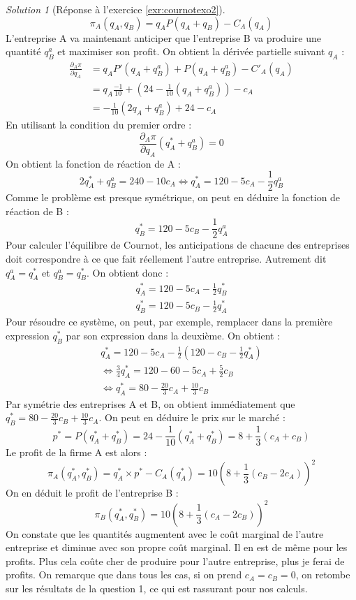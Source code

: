 \documentclass[
]{book}
\theoremstyle{definition}
\theoremstyle{definition}
\theoremstyle{definition}
\theoremstyle{definition}
\theoremstyle{remark}
\newtheorem*{solution}{Solution}
\begin{document}
\begin{solution}[Réponse à l'exercice \ref{exr:cournotexo2}]
\[\pi_A(q_A, q_B)=q_AP(q_A+q_B)-C_A(q_A)\]
L'entreprise A va maintenant anticiper que l'entreprise B va produire une quantité \(q_B^a\) et maximiser son profit.
On obtient la dérivée partielle suivant \(q_A\) :
\begin{align*}
\frac{\partial_A\pi}{\partial q_A}&=q_AP'(q_A+q_B^a)+P(q_A+q_B^a)-C'_A(q_A)\\
&=q_A\frac{-1}{10}+(24-\frac{1}{10}(q_A+q_B^a))-c_A\\
&=-\frac{1}{10}(2q_A+q_B^a)+24-c_A
\end{align*}
En utilisant la condition du premier ordre :
\[\frac{\partial_A\pi}{\partial q_A}(q_A^*+q_B^a)=0\]
On obtient la fonction de réaction de A :
\[2q_A^*+q_B^a=240-10c_A\Leftrightarrow q_A^*=120-5c_A-\frac{1}{2}q_B^a\]
Comme le problème est presque symétrique, on peut en déduire la fonction de réaction de B :
\[q_B^*=120-5c_B-\frac{1}{2}q_A^a\]
Pour calculer l'équilibre de Cournot, les anticipations de chacune des entreprises doit correspondre à ce que fait réellement l'autre entreprise.
Autrement dit \(q_A^a=q_A^*\) et \(q_B^a=q_B^*\).
On obtient donc :
\begin{gather*}
q_A^*=120-5c_A-\frac{1}{2}q_B^*\\
q_B^*=120-5c_B-\frac{1}{2}q_A^*
\end{gather*}
Pour résoudre ce système, on peut, par exemple, remplacer dans la première expression \(q_B^*\) par son expression dans la deuxième.
On obtient :
\begin{gather*}
q_A^*=120-5c_A-\frac{1}{2}\left(120-c_B-\frac{1}{2}q_A^*\right) \\
\Leftrightarrow \frac{3}{4}q_A^*=120-60-5c_A+\frac{5}{2}c_B\\
\Leftrightarrow q_A^*=80-\frac{20}{3}c_A+\frac{10}{3}c_B
\end{gather*}
Par symétrie des entreprises A et B, on obtient immédiatement que \(q_B^*=80-\frac{20}{3}c_B+\frac{10}{3}c_A\).
On peut en déduire le prix sur le marché :
\[p^*=P(q_A^*+q_B^*)=24-\frac{1}{10}(q_A^*+q_B^*)=8+\frac{1}{3}(c_A+c_B)\]
Le profit de la firme A est alors :
\[\pi_A(q_A^*, q_B^*)=q_A^*\times p^*-C_A(q_A^*)=10\left(8+\frac{1}{3}\left(c_B-2c_A\right)\right)^2\]
On en déduit le profit de l'entreprise B :
\[\pi_B(q_A^*, q_B^*)=10\left(8+\frac{1}{3}\left(c_A-2c_B\right)\right)^2\]
On constate que les quantités augmentent avec le coût marginal de l'autre entreprise et diminue avec son propre coût marginal.
Il en est de même pour les profits.
Plus cela coûte cher de produire pour l'autre entreprise, plus je ferai de profits.
On remarque que dans tous les cas, si on prend \(c_A=c_B=0\), on retombe sur les résultats de la question 1, ce qui est rassurant pour nos calculs.
\end{solution}
\end{document}
